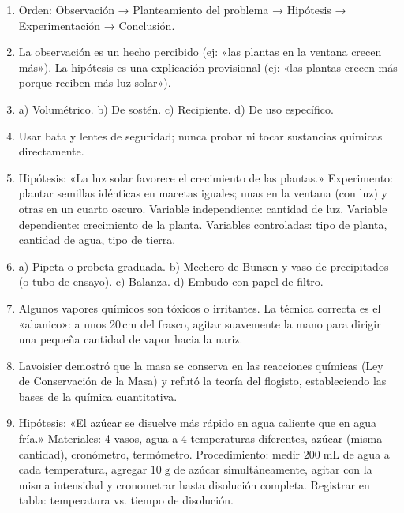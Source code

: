 \documentclass[12pt, letterpaper]{article}
\begin{document}
  \begin{enumerate}[leftmargin=*, label=\textbf{\arabic*.}]
    \item Orden: Observación → Planteamiento del problema → Hipótesis → Experimentación → Conclusión.

    \item La observación es un hecho percibido (ej: «las plantas en la ventana crecen más»). La hipótesis es una explicación provisional (ej: «las plantas crecen más porque reciben más luz solar»).

    \item a) Volumétrico. b) De sostén. c) Recipiente. d) De uso específico.

    \item Usar bata y lentes de seguridad; nunca probar ni tocar sustancias químicas directamente.

    \item Hipótesis: «La luz solar favorece el crecimiento de las plantas.» Experimento: plantar semillas idénticas en macetas iguales; unas en la ventana (con luz) y otras en un cuarto oscuro. Variable independiente: cantidad de luz. Variable dependiente: crecimiento de la planta. Variables controladas: tipo de planta, cantidad de agua, tipo de tierra.

    \item a) Pipeta o probeta graduada. b) Mechero de Bunsen y vaso de precipitados (o tubo de ensayo). c) Balanza. d) Embudo con papel de filtro.

    \item Algunos vapores químicos son tóxicos o irritantes. La técnica correcta es el «abanico»: a unos 20\,cm del frasco, agitar suavemente la mano para dirigir una pequeña cantidad de vapor hacia la nariz.

    \item Lavoisier demostró que la masa se conserva en las reacciones químicas (Ley de Conservación de la Masa) y refutó la teoría del flogisto, estableciendo las bases de la química cuantitativa.

    \item Hipótesis: «El azúcar se disuelve más rápido en agua caliente que en agua fría.» Materiales: 4 vasos, agua a 4 temperaturas diferentes, azúcar (misma cantidad), cronómetro, termómetro. Procedimiento: medir $200\;\text{mL}$ de agua a cada temperatura, agregar $10\;\text{g}$ de azúcar simultáneamente, agitar con la misma intensidad y cronometrar hasta disolución completa. Registrar en tabla: temperatura vs. tiempo de disolución.


\end{enumerate}
\end{document}
